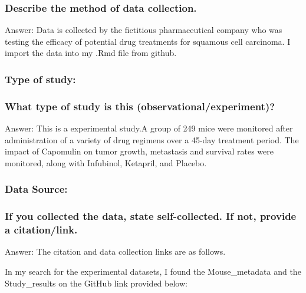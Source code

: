 \documentclass[
]{article}
\begin{document}
\hypertarget{describe-the-method-of-data-collection.}{%
\subsubsection{Describe the method of data
collection.}\label{describe-the-method-of-data-collection.}}

Answer: Data is collected by the fictitious pharmaceutical company who
was testing the efficacy of potential drug treatments for squamous cell
carcinoma. I import the data into my .Rmd file from github.

\hypertarget{type-of-study}{%
\subsubsection{Type of study:}\label{type-of-study}}

\hypertarget{what-type-of-study-is-this-observationalexperiment}{%
\subsubsection{What type of study is this
(observational/experiment)?}\label{what-type-of-study-is-this-observationalexperiment}}

Answer: This is a experimental study.A group of 249 mice were monitored
after administration of a variety of drug regimens over a 45-day
treatment period. The impact of Capomulin on tumor growth, metastasis
and survival rates were monitored, along with Infubinol, Ketapril, and
Placebo.

\hypertarget{data-source}{%
\subsubsection{Data Source:}\label{data-source}}

\hypertarget{if-you-collected-the-data-state-self-collected.-if-not-provide-a-citationlink.}{%
\subsubsection{If you collected the data, state self-collected. If not,
provide a
citation/link.}\label{if-you-collected-the-data-state-self-collected.-if-not-provide-a-citationlink.}}

Answer: The citation and data collection links are as follows.

In my search for the experimental datasets, I found the Mouse\_metadata
and the Study\_results on the GitHub link provided below:
\end{document}
